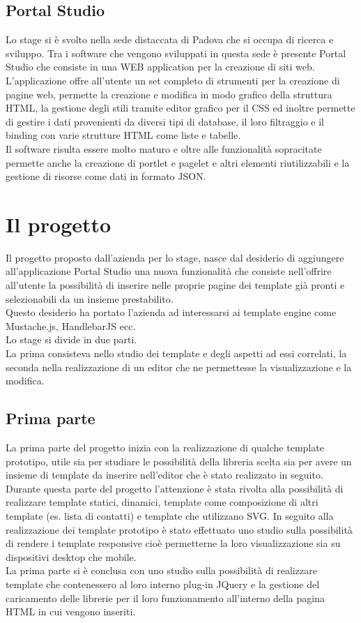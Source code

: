 \subsection{Portal Studio}
Lo stage si è svolto nella sede distaccata di Padova che si occupa di ricerca e sviluppo.
Tra i software che vengono sviluppati in questa sede è presente Portal Studio che consiste in una WEB application per la creazione di siti web.\\
L'applicazione offre all'utente un set completo di strumenti per la creazione di pagine web, permette la creazione e modifica in modo grafico della struttura HTML, la gestione degli stili tramite editor grafico per il CSS ed inoltre permette di gestire i dati provenienti da diversi tipi di database, il loro filtraggio e il binding con varie strutture HTML come liste e tabelle.\\
Il software risulta essere molto maturo e oltre alle funzionalità sopracitate permette anche la creazione di portlet e pagelet e altri elementi riutilizzabili e la gestione di risorse come dati in formato JSON.


\section{Il progetto}
Il progetto proposto dall'azienda per lo stage, nasce dal desiderio di aggiungere all'applicazione Portal Studio una nuova funzionalità che consiste nell'offrire all'utente la possibilità di inserire nelle proprie pagine dei template già pronti e selezionabili da un insieme prestabilito.\\
Questo desiderio ha portato l'azienda ad interessarsi ai template engine come Mustache.js, HandlebarJS ecc.\\
Lo stage si divide in due parti.\\
La prima consisteva nello studio dei template e degli aspetti ad essi correlati, la seconda nella realizzazione di un editor che ne permettesse la visualizzazione e la modifica.
\subsection{Prima parte}
La prima parte del progetto inizia con la realizzazione di qualche template prototipo, utile sia per studiare le possibilità della libreria scelta sia per avere un insieme di template da inserire nell'editor che è stato realizzato in seguito.\\
Durante questa parte del progetto l'attenzione è stata rivolta alla possibilità di realizzare template statici, dinamici, template come composizione di altri template (es. lista di contatti) e template che utilizzano SVG.
In seguito alla realizzazione dei template prototipo è stato effettuato uno studio sulla possibilità di rendere i template responsive cioè permetterne la loro visualizzazione sia su dispositivi desktop che mobile.\\
La prima parte si è conclusa con uno studio sulla possibilità di realizzare template che contenessero al loro interno plug-in JQuery e la gestione del caricamento delle librerie per il loro funzionamento all'interno della pagina HTML in cui vengono inseriti.
